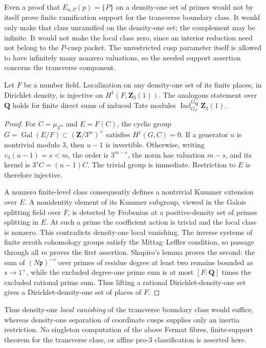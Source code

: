 Even a proof that \(E_{a,P}(p)=\{P\}\) on a density-one set of primes
would not by itself prove finite ramification support for the
transverse boundary class. It would only make that class unramified on
the density-one set; the complement may be infinite. It would not make
the local class zero, since an interior reduction need not belong to
the \(P\)-cusp packet. The unrestricted cusp parameter itself is
allowed to have infinitely many nonzero valuations, so the needed
support assertion concerns the transverse component.

\begin{lemma}\label{lem:density-one-kummer-localization}
Let \(F\) be a number field. Localization on any density-one set of its
finite places, in Dirichlet density, is injective on \(H^1(F,\mathbf Z_3(1))\). The analogous
statement over \(\mathbf Q\) holds for finite direct sums of induced
Tate modules
\(\operatorname{Ind}_{G_F}^{G_{\mathbf Q}}\mathbf Z_3(1)\).
\end{lemma}
\begin{proof}
For \(C=\mu_{3^m}\) and \(E=F(C)\), the cyclic group
\(G=\operatorname{Gal}(E/F)\subset(\mathbf Z/3^m)^\times\) satisfies
\(H^1(G,C)=0\). If a generator \(u\) is nontrivial modulo \(3\), then
\(u-1\) is invertible. Otherwise, writing
\(v_3(u-1)=s<m\), the order is \(3^{m-s}\), the norm has valuation
\(m-s\), and its kernel is \(3^sC=(u-1)C\). The trivial group is
immediate. Restriction to \(E\) is therefore injective.

A nonzero finite-level class consequently defines a nontrivial
Kummer extension over \(E\). A nonidentity element of its Kummer
subgroup, viewed in the Galois splitting field over \(F\), is detected
by Frobenius at a positive-density set of primes splitting in \(E\).
At such a prime the coefficient action is trivial and the local
class is nonzero. This contradicts density-one local vanishing.
The inverse systems of finite zeroth cohomology groups satisfy the Mittag--Leffler condition, so passage through all \(m\) proves the first assertion. Shapiro's lemma
proves the second: the sum of $(N\mathfrak p)^{-s}$ over primes of residue degree at least
two remains bounded as $s\to1^+$, while the excluded degree-one prime
sum is at most $[F:\mathbf Q]$ times the excluded rational prime sum.
Thus lifting a rational Dirichlet-density-one set gives a
Dirichlet-density-one set of places of $F$.
\end{proof}

Thus density-one \emph{local vanishing} of the transverse boundary
class would suffice, whereas density-one separation of coordinate
cusps supplies only an inertia restriction. No singleton computation
of the above Fermat fibres, finite-support theorem for the transverse
class, or affine pro-\(3\) classification is asserted here.
